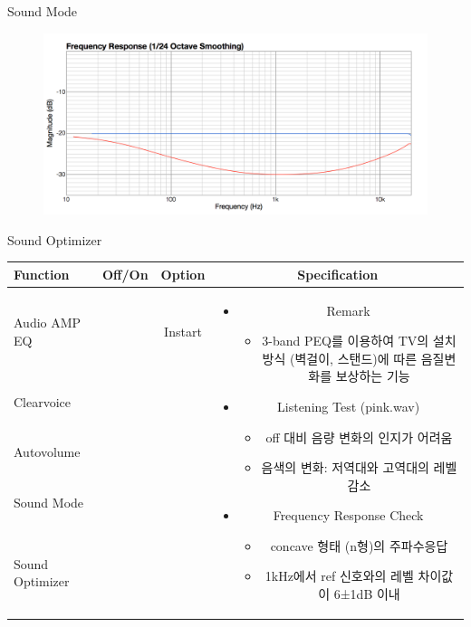 \documentclass{beamer}
\begin{document}
\begin{frame}[t]{Sound Mode}
\begin{figure}[b]
\includegraphics[height=0.32\textwidth]{figure/soundmode.png}
\end{figure}

\end{frame}


\begin{frame}[t]{Sound Optimizer}
\begin{tiny}
\begin{tabular}{@{}lccc@{}}
\toprule
Function & Off/On & Option & Specification \\
\midrule
Audio AMP EQ & \color{black}{Off} & Instart &
\multirow{14}{60mm}{
\begin{itemize}
\item Remark
	\begin{itemize}
	\item 3-band PEQ를 이용하여 TV의 설치 방식 (벽걸이, 스탠드)에 따른 음질변화를 보상하는 기능
	\end{itemize}
\item Listening Test (pink.wav)
	\begin{itemize}
	\item off 대비 음량 변화의 인지가 어려움
	\item 음색의 변화: 저역대와 고역대의 레벨 감소
	\end{itemize}
\item Frequency Response Check
  \begin{itemize}
  \item concave 형태 (n형)의 주파수응답
  \item 1kHz에서 ref 신호와의 레벨 차이값이 6±1dB 이내
  \end{itemize}
\end{itemize}
} \\
Clearvoice & \color{black}{Off} & & \\
Autovolume & \color{black}{Off} & & \\
Sound Mode & \color{black}{Off} & & \\
Sound Optimizer & \color{blue}{On} & & \\

\end{tabular}
\end{tiny}
\end{frame}
\end{document}
